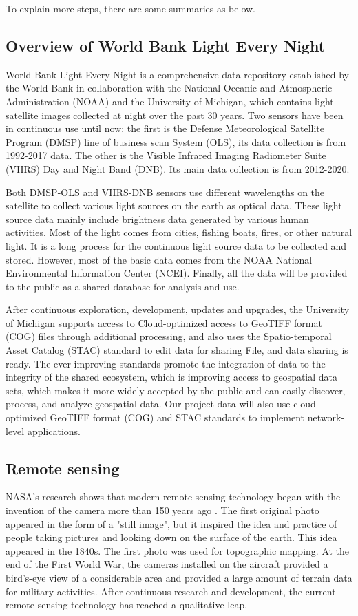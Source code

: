 \documentclass[conference]{IEEEtran}
\begin{document}
To explain more steps, there are some summaries as below. 

\subsection{Overview of World Bank Light Every Night}
World Bank Light Every Night \cite{WorldBan13:online} is a comprehensive data repository established by the World Bank in collaboration with the National Oceanic and Atmospheric Administration (NOAA) and the University of Michigan, which contains light satellite images collected at night over the past 30 years. Two sensors have been in continuous use until now: the first is the Defense Meteorological Satellite Program (DMSP) line of business scan
System (OLS), its data collection is from 1992-2017 data. The other is the Visible Infrared Imaging Radiometer Suite (VIIRS) Day and Night Band (DNB). Its main data collection is from 2012-2020.
    
Both DMSP-OLS and VIIRS-DNB sensors use different wavelengths on the satellite to collect various light sources on the earth as optical data. These light source data mainly include brightness data generated by various human activities. Most of the light comes from cities, fishing boats, fires, or other natural light. It is a long process for the continuous light source data to be collected and stored. However, most of the basic data comes from the NOAA National Environmental Information Center (NCEI). Finally, all the data will be provided to the public as a shared database for analysis and use.
    
After continuous exploration, development, updates and upgrades, the University of Michigan supports access to Cloud-optimized access to GeoTIFF format (COG) files through additional processing, and also uses the Spatio-temporal Asset Catalog (STAC) standard to edit data for sharing File, and data sharing is ready. The ever-improving standards promote the integration of data to the integrity of the shared ecosystem, which is improving access to geospatial data sets, which makes it more widely accepted by the public and can easily discover, process, and analyze geospatial data. Our project data will also use cloud-optimized GeoTIFF format (COG) and STAC standards to implement network-level applications.

\subsection{Remote sensing}
NASA's research shows that modern remote sensing technology began with the invention of the camera more than 150 years ago \cite{earthdata28:online}. The first original photo appeared in the form of a "still image", but it inspired the idea and practice of people taking pictures and looking down on the surface of the earth. This idea appeared in the 1840s. The first photo was used for topographic mapping. At the end of the First World War, the cameras installed on the aircraft provided a bird's-eye view of a considerable area and provided a large amount of terrain data for military activities. After continuous research and development, the current remote sensing technology has reached a qualitative leap.
\end{document}
